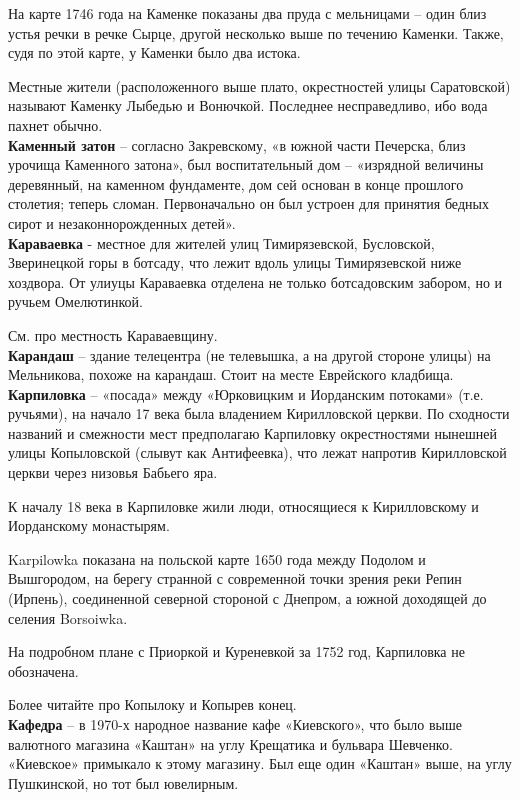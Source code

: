 На карте 1746 года на Каменке показаны два пруда с мельницами – один близ устья речки в речке Сырце, другой несколько выше по течению Каменки. Также, судя по этой карте, у Каменки было два истока.

Местные жители (расположенного выше плато, окрестностей улицы Саратовской) называют Каменку Лыбедью и Вонючкой. Последнее несправедливо, ибо вода пахнет обычно.\\

\textbf{Каменный затон} – согласно Закревскому, «в южной части Печерска, близ урочища Каменного затона», был воспитательный дом – «изрядной величины деревянный, на каменном фундаменте, дом сей основан в конце прошлого столетия; теперь сломан. Первоначально он был устроен для принятия бедных сирот и незаконнорожденных детей».\\

\textbf{Караваевка} - местное для жителей улиц Тимирязевской, Бусловской, Зверинецкой горы в ботсаду, что лежит вдоль улицы Тимирязевской ниже хоздвора. От улиуцы Караваевка отделена не только ботсадовским забором, но и ручьем Омелютинкой.

См. про местность Караваевщину.\\ 

\textbf{Карандаш} – здание телецентра (не телевышка, а на другой стороне улицы) на Мельникова, похоже на карандаш. Стоит на месте Еврейского кладбища.\\

\textbf{Карпиловка} – «посада» между «Юрковицким и Иорданским потоками» (т.е. ручьями), на начало 17 века была владением Кирилловской церкви. По сходности названий и смежности мест предполагаю Карпиловку окрестностями нынешней улицы Копыловской (слывут как Антифеевка), что лежат напротив Кирилловской церкви через низовья Бабьего яра.

К началу 18 века в Карпиловке жили люди, относящиеся к Кирилловскому и Иорданскому монастырям.

Karpilowka показана на польской карте 1650 года между Подолом и Вышгородом, на берегу странной с современной точки зрения реки Репин (Ирпень), соединенной северной стороной с Днепром, а южной доходящей до селения Borsoiwka. 

На подробном плане с Приоркой и Куреневкой за 1752 год, Карпиловка не обозначена.

Более читайте про Копылоку и Копырев конец.\\


\textbf{Кафедра} – в 1970-х народное название кафе «Киевского», что было выше валютного магазина «Каштан» на углу Крещатика и бульвара Шевченко. «Киевское» примыкало к этому магазину. Был еще один «Каштан» выше, на углу Пушкинской, но тот был ювелирным.\\

